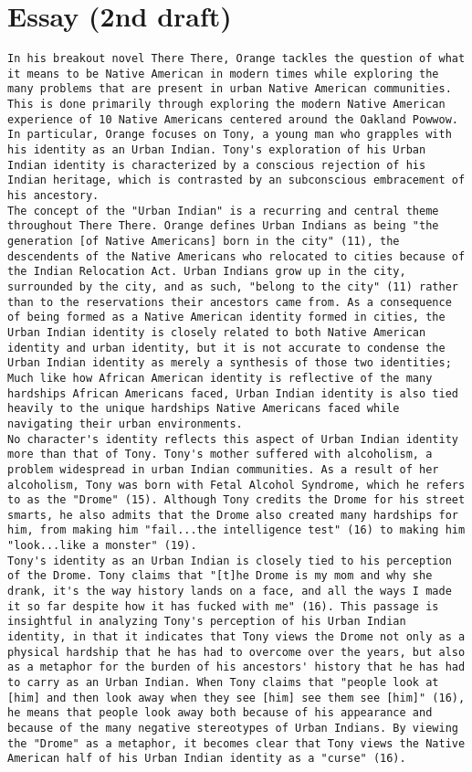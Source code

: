 \documentclass[letterpaper]{article}
\begin{document}
\section{Essay (2nd draft)}
\label{sec:org9726f56}
\begin{verbatim}
In his breakout novel There There, Orange tackles the question of what it means to be Native American in modern times while exploring the many problems that are present in urban Native American communities. This is done primarily through exploring the modern Native American experience of 10 Native Americans centered around the Oakland Powwow. In particular, Orange focuses on Tony, a young man who grapples with his identity as an Urban Indian. Tony's exploration of his Urban Indian identity is characterized by a conscious rejection of his Indian heritage, which is contrasted by an subconscious embracement of his ancestory.
The concept of the "Urban Indian" is a recurring and central theme throughout There There. Orange defines Urban Indians as being "the generation [of Native Americans] born in the city" (11), the descendents of the Native Americans who relocated to cities because of the Indian Relocation Act. Urban Indians grow up in the city, surrounded by the city, and as such, "belong to the city" (11) rather than to the reservations their ancestors came from. As a consequence of being formed as a Native American identity formed in cities, the Urban Indian identity is closely related to both Native American identity and urban identity, but it is not accurate to condense the Urban Indian identity as merely a synthesis of those two identities; Much like how African American identity is reflective of the many  hardships African Americans faced, Urban Indian identity is also tied heavily to the unique hardships Native Americans faced while navigating their urban environments.
No character's identity reflects this aspect of Urban Indian identity more than that of Tony. Tony's mother suffered with alcoholism, a problem widespread in urban Indian communities. As a result of her alcoholism, Tony was born with Fetal Alcohol Syndrome, which he refers to as the "Drome" (15). Although Tony credits the Drome for his street smarts, he also admits that the Drome also created many hardships for him, from making him "fail...the intelligence test" (16) to making him "look...like a monster" (19).
Tony's identity as an Urban Indian is closely tied to his perception of the Drome. Tony claims that "[t]he Drome is my mom and why she drank, it's the way history lands on a face, and all the ways I made it so far despite how it has fucked with me" (16). This passage is insightful in analyzing Tony's perception of his Urban Indian identity, in that it indicates that Tony views the Drome not only as a physical hardship that he has had to overcome over the years, but also as a metaphor for the burden of his ancestors' history that he has had to carry as an Urban Indian. When Tony claims that "people look at [him] and then look away when they see [him] see them see [him]" (16), he means that people look away both because of his appearance and because of the many negative stereotypes of Urban Indians. By viewing the "Drome" as a metaphor, it becomes clear that Tony views the Native American half of his Urban Indian identity as a "curse" (16). 

\end{verbatim}
\end{document}
